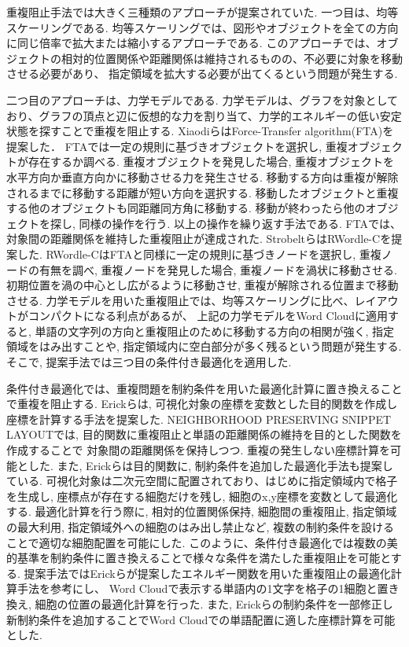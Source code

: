 \documentclass[syuuron]{kuee}
\begin{document}
		重複阻止手法では大きく三種類のアプローチが提案されていた. 
		一つ目は、均等スケーリングである. 均等スケーリングでは、図形やオブジェクトを全ての方向に同じ倍率で拡大または縮小するアプローチである. 
		このアプローチでは、オブジェクトの相対的位置関係や距離関係は維持されるものの、不必要に対象を移動させる必要があり、
		指定領域を拡大する必要が出てくるという問題が発生する. 
		
		二つ目のアプローチは、力学モデルである. 
		力学モデルは、グラフを対象としており、グラフの頂点と辺に仮想的な力を割り当て、力学的エネルギーの低い安定状態を探すことで重複を阻止する. 
		XiaodiらはForce-Transfer algorithm(FTA)を提案した\cite{fta1}．
		FTAでは一定の規則に基づきオブジェクトを選択し, 重複オブジェクトが存在するか調べる. 
		重複オブジェクトを発見した場合, 重複オブジェクトを水平方向か垂直方向かに移動させる力を発生させる. 
		移動する方向は重複が解除されるまでに移動する距離が短い方向を選択する. 移動したオブジェクトと重複する他のオブジェクトも同距離同方角に移動する. 
		移動が終わったら他のオブジェクトを探し, 同様の操作を行う. 以上の操作を繰り返す手法である. 
		FTAでは、対象間の距離関係を維持した重複阻止が達成された. 
		StrobeltらはRWordle-Cを提案した\cite{rwc1}. 
		RWordle-CはFTAと同様に一定の規則に基づきノードを選択し, 重複ノードの有無を調べ, 
		重複ノードを発見した場合, 重複ノードを渦状に移動させる. 初期位置を渦の中心とし広がるように移動させ, 重複が解除される位置まで移動させる. 
		力学モデルを用いた重複阻止では、均等スケーリングに比べ、レイアウトがコンパクトになる利点があるが、
		上記の力学モデルをWord Cloudに適用すると, 単語の文字列の方向と重複阻止のために移動する方向の相関が強く, 
		指定領域をはみ出すことや, 指定領域内に空白部分が多く残るという問題が発生する. 
		そこで, 提案手法では三つ目の条件付き最適化を適用した. 
		
		条件付き最適化では、重複問題を制約条件を用いた最適化計算に置き換えることで重複を阻止する. 
		Erickらは, 可視化対象の座標を変数とした目的関数を作成し座標を計算する手法を提案した\cite{or1}. 
		NEIGHBORHOOD PRESERVING SNIPPET LAYOUTでは, 目的関数に重複阻止と単語の距離関係の維持を目的とした関数を作成することで
		対象間の距離関係を保持しつつ. 重複の発生しない座標計算を可能とした. 
		また, Erickらは目的関数に, 制約条件を追加した最適化手法も提案している\cite{or2}.  
		可視化対象は二次元空間に配置されており、はじめに指定領域内で格子を生成し, 座標点が存在する細胞だけを残し, 細胞のx,y座標を変数として最適化する. 
		最適化計算を行う際に, 相対的位置関係保持, 細胞間の重複阻止, 指定領域の最大利用, 指定領域外への細胞のはみ出し禁止など, 
		複数の制約条件を設けることで適切な細胞配置を可能にした. 
		このように、条件付き最適化では複数の美的基準を制約条件に置き換えることで様々な条件を満たした重複阻止を可能とする. 
		提案手法ではErickらが提案したエネルギー関数を用いた重複阻止の最適化計算手法を参考にし、
		Word Cloudで表示する単語内の1文字を格子の1細胞と置き換え, 細胞の位置の最適化計算を行った. 
		また, Erickらの制約条件を一部修正し新制約条件を追加することでWord Cloudでの単語配置に適した座標計算を可能とした. 
	
\end{document}
